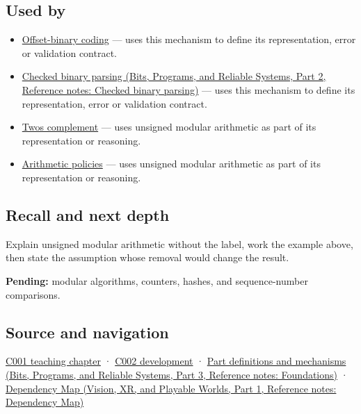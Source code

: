 \subsection{Used by}\label{appendix-c99977d88b33-used-by}

\hypertarget{appendix-c99977d88b33-used-by}{}

\begin{itemize}
\item
  \hyperref[appendix-53a8cfb25f8d]{Offset-binary coding} --- uses this mechanism to define its representation, error or validation contract.
\item
  \href{../01-Bits-Programs-and-Reliable-Systems-P02/main.pdf\#appendix-652d81568de9}{Checked binary parsing (Bits, Programs, and Reliable Systems, Part 2, Reference notes: Checked binary parsing)} --- uses this mechanism to define its representation, error or validation contract.
\item
  \hyperref[appendix-4fbc03d20829]{Two\textquotesingle s complement} --- uses unsigned modular arithmetic as part of its representation or reasoning.
\item
  \hyperref[appendix-2ed044358b82]{Arithmetic policies} --- uses unsigned modular arithmetic as part of its representation or reasoning.
\end{itemize}

\subsection{Recall and next depth}\label{appendix-c99977d88b33-recall-and-next-depth}

\hypertarget{appendix-c99977d88b33-recall-and-next-depth}{}

Explain unsigned modular arithmetic without the label, work the example above, then state the assumption whose removal would change the result.

\textbf{Pending:} modular algorithms, counters, hashes, and sequence-number comparisons.

\subsection{Source and navigation}\label{appendix-c99977d88b33-source-and-navigation}

\hypertarget{appendix-c99977d88b33-source-and-navigation}{}

\hyperref[01-foundations-i-ch001-from-a-signal-to-an-interpretation]{C001 teaching chapter} · \hyperref[01-foundations-i-ch001-arithmetic-becomes-a-policy]{C002 development} · \href{../01-Bits-Programs-and-Reliable-Systems-P03/main.pdf\#appendix-fd090d982a15}{Part definitions and mechanisms (Bits, Programs, and Reliable Systems, Part 3, Reference notes: Foundations)} · \href{../07-Vision-XR-and-Playable-Worlds-P01/main.pdf\#appendix-4ad47bdd269a}{Dependency Map (Vision, XR, and Playable Worlds, Part 1, Reference notes: Dependency Map)}
